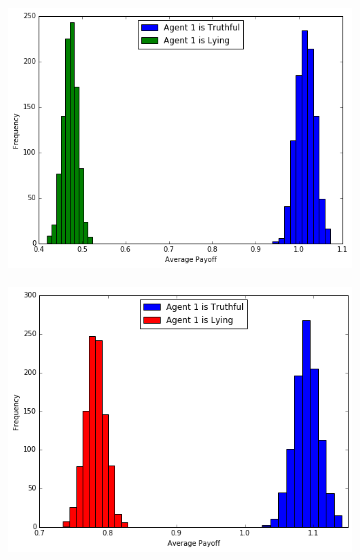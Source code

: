 \documentclass{scrartcl}
\begin{document}
\begin{figure}[H]
\caption{Private-Prior with 3 signals}
\begin{subfigure}{0.4\textwidth}
\includegraphics[scale=0.4]{images/3_1}
\end{subfigure}
\hspace{0.1\textwidth}
\begin{subfigure}{0.4\textwidth}
\includegraphics[scale=0.4]{images/3_2}
\end{subfigure}
\end{figure}
\end{document}

